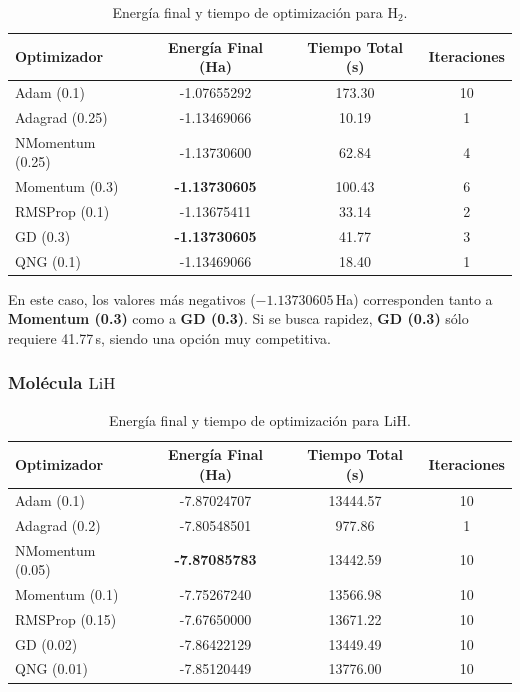 \begin{table}[h!]
\centering
\caption{Energía final y tiempo de optimización para \(\mathrm{H_2}\).}
\begin{tabular}{lccc}
\toprule
\textbf{Optimizador} & \textbf{Energía Final (Ha)} & \textbf{Tiempo Total (s)} & \textbf{Iteraciones}\\
\midrule
Adam (0.1)       & -1.07655292  & 173.30  & 10 \\
Adagrad (0.25)   & -1.13469066  & 10.19   &  1 \\
NMomentum (0.25) & -1.13730600  & 62.84   &  4 \\
Momentum (0.3)   & \textbf{-1.13730605} & 100.43  &  6 \\
RMSProp (0.1)    & -1.13675411  & 33.14   &  2 \\
GD (0.3)         & \textbf{-1.13730605} & 41.77   &  3 \\
QNG (0.1)        & -1.13469066  & 18.40   &  1 \\
\bottomrule
\end{tabular}
\end{table}

En este caso, los valores más negativos (\(-1.13730605\)\,Ha) corresponden tanto a \textbf{Momentum (0.3)} como a \textbf{GD (0.3)}. Si se busca rapidez, \textbf{GD (0.3)} sólo requiere 41.77\,s, siendo una opción muy competitiva.

\subsubsection{Molécula \(\mathrm{LiH}\)}

\begin{table}[H]
\centering
\caption{Energía final y tiempo de optimización para \(\mathrm{LiH}\).}
\begin{tabular}{lccc}
\toprule
\textbf{Optimizador} & \textbf{Energía Final (Ha)} & \textbf{Tiempo Total (s)} & \textbf{Iteraciones}\\
\midrule
Adam (0.1)       & -7.87024707 & 13444.57 & 10 \\
Adagrad (0.2)    & -7.80548501 & 977.86   &  1 \\
NMomentum (0.05) & \textbf{-7.87085783} & 13442.59 & 10 \\
Momentum (0.1)   & -7.75267240 & 13566.98 & 10 \\
RMSProp (0.15)   & -7.67650000 & 13671.22 & 10 \\
GD (0.02)        & -7.86422129 & 13449.49 & 10 \\
QNG (0.01)       & -7.85120449 & 13776.00 & 10 \\
\bottomrule
\end{tabular}
\end{table}


